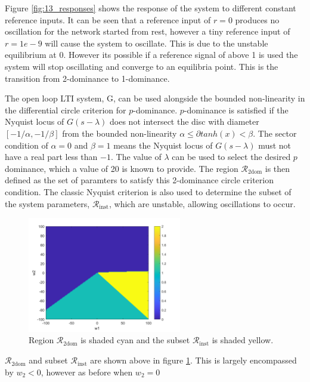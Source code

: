 \documentclass{article}
\begin{document}
Figure \ref{fig:13_responses} shows the response of the system to different constant reference inputs.
It can be seen that a reference input of $r = 0$ produces no oscillation for the network started from rest, however a tiny reference input of $r=1e-9$ will cause the system to oscillate.
This is due to the unstable equilibrium at 0.
However its possible if a reference signal of above 1 is used the system will stop oscillating and converge to an equilibria point.
This is the transition from 2-dominance to 1-dominance.

The open loop LTI system, G, can be used alongside the bounded non-linearity in the differential circle criterion for $p$-dominance.
$p$-dominance is satisfied if the Nyquist locus of $G(s-\lambda)$ does not intersect the disc with diameter $[-1/\alpha, -1/\beta]$ from the bounded non-linearity $\alpha \leq \partial tanh(x) < \beta$.
The sector condition of $\alpha=0$ and $\beta=1$ means the Nyquist locus of $G(s-\lambda)$ must not have a real part less than $-1$.
The value of $\lambda$ can be used to select the desired $p$ dominance, which a value of 20 is known to provide.
The region $\mathcal{R}_\text{2dom}$ is then defined as the set of paramters to satisfy this 2-dominance circle criterion condition.
The classic Nyquist criterion is also used to determine the subset of the system parameters, $\mathcal{R}_\text{inst}$, which are unstable, allowing oscillations to occur.

\begin{figure}[H]
    \centering
    \includegraphics[width=0.6\textwidth]{figures/R2dom.png}
    \caption{Region $\mathcal{R}_\text{2dom}$ is shaded cyan and the subset $\mathcal{R}_\text{inst}$ is shaded yellow.}
    \label{fig:R2dom}
\end{figure}

$\mathcal{R}_\text{2dom}$ and subset $\mathcal{R}_\text{inst}$ are shown above in figure \ref{fig:R2dom}.
This is largely encompassed by $w_2 < 0$, however as before when $w_2 = 0$ 
\end{document}
